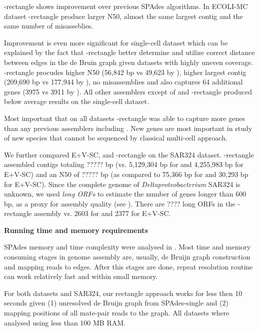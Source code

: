 {\spades}-rectangle shows improvement over previous SPAdes algorithms. In ECOLI-MC dataset {\spades}-rectangle produce larger N50, almost the same largest contig and the same number of misasseblies.

Improvement is even more significant for single-cell dataset which can be explained by the fact that {\spades}-rectangle better determine and utilize correct distance between edges in the de Bruin graph given datasets with highly uneven coverage. {\spades}-rectangle procudes higher N50 (56,842 bp vs 49,623 by {\spades}), higher largest contig (209,690 bp vs 177,944 by {\spades}), no misassemblies and also captures 64 additional genes (3975 vs 3911 by {\spades}). All other assemblers except of {\spades} and {\spades}-rectangle produced below average results on the single-cell dataset.

Most important that on all datasets {\spades}-rectangle was able to capture more genes than any previous assemblers including {\spades}. New genes are most important in study of new species that cannot be sequenced by classical multi-cell approach.

We further compared E+V-SC, {\spades} and {\spades}-rectangle on the SAR324 dataset.
{\spades}-rectangle assembled contigs totaling ????? bp
(vs. 5,129,304 bp for {\spades} and 4,255,983 bp for E+V-SC) and an N50 of ????? bp (as compared to 75,366 bp for {\spades} and 30,293 bp for E+V-SC).
Since the complete genome of \emph{Deltaproteobacterium} SAR324 is unknown,
we used {\em long ORFs} to estimate the number of genes longer than 600 bp, as a proxy for assembly quality (see \cite{Chitsaz2011}).
There are ???? long ORFs in the {\spades}-rectangle assembly
vs. 2603 for {\spades} and 2377 for E+V-SC.



\textbf{Running time and memory requirements}

SPAdes memory and time complexity were analysed in \cite{SPAdes}. Most time and memory consuming stages in genome assembly are, usually, de Bruijn graph construction and mapping reads to edges. After this stages are done, repeat resolution routine can work relatively fast and within small memory.

For both {\ecoli} datasets and SAR324, our rectangle approach works for less then 10 seconds given (1) unresolved de Bruijn graph from SPAdes-single and (2) mapping positions of all mate-pair reads to the graph. All datasets where analysed using less than 100 MB RAM.
